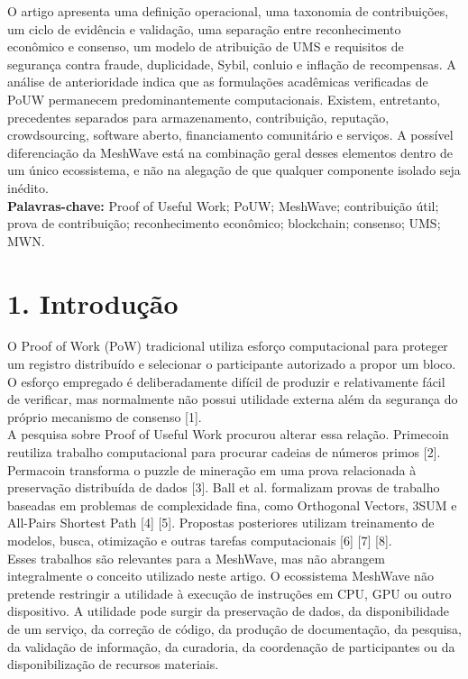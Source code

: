 \documentclass[12pt,a4paper]{article}
\begin{document}
O artigo apresenta uma definição operacional, uma taxonomia de contribuições, um ciclo de evidência e validação, uma separação entre reconhecimento econômico e consenso, um modelo de atribuição de UMS e requisitos de segurança contra fraude, duplicidade, Sybil, conluio e inflação de recompensas. A análise de anterioridade indica que as formulações acadêmicas verificadas de PoUW permanecem predominantemente computacionais. Existem, entretanto, precedentes separados para armazenamento, contribuição, reputação, crowdsourcing, software aberto, financiamento comunitário e serviços. A possível diferenciação da MeshWave está na combinação geral desses elementos dentro de um único ecossistema, e não na alegação de que qualquer componente isolado seja inédito.\\

\textbf{Palavras-chave:} Proof of Useful Work; PoUW; MeshWave; contribuição útil; prova de contribuição; reconhecimento econômico; blockchain; consenso; UMS; MWN.\\


\section{1. Introdução}

O Proof of Work (PoW) tradicional utiliza esforço computacional para proteger um registro distribuído e selecionar o participante autorizado a propor um bloco. O esforço empregado é deliberadamente difícil de produzir e relativamente fácil de verificar, mas normalmente não possui utilidade externa além da segurança do próprio mecanismo de consenso [1].\\

A pesquisa sobre Proof of Useful Work procurou alterar essa relação. Primecoin reutiliza trabalho computacional para procurar cadeias de números primos [2]. Permacoin transforma o puzzle de mineração em uma prova relacionada à preservação distribuída de dados [3]. Ball et al. formalizam provas de trabalho baseadas em problemas de complexidade fina, como Orthogonal Vectors, 3SUM e All-Pairs Shortest Path [4] [5]. Propostas posteriores utilizam treinamento de modelos, busca, otimização e outras tarefas computacionais [6] [7] [8].\\

Esses trabalhos são relevantes para a MeshWave, mas não abrangem integralmente o conceito utilizado neste artigo. O ecossistema MeshWave não pretende restringir a utilidade à execução de instruções em CPU, GPU ou outro dispositivo. A utilidade pode surgir da preservação de dados, da disponibilidade de um serviço, da correção de código, da produção de documentação, da pesquisa, da validação de informação, da curadoria, da coordenação de participantes ou da disponibilização de recursos materiais.\\
\end{document}
